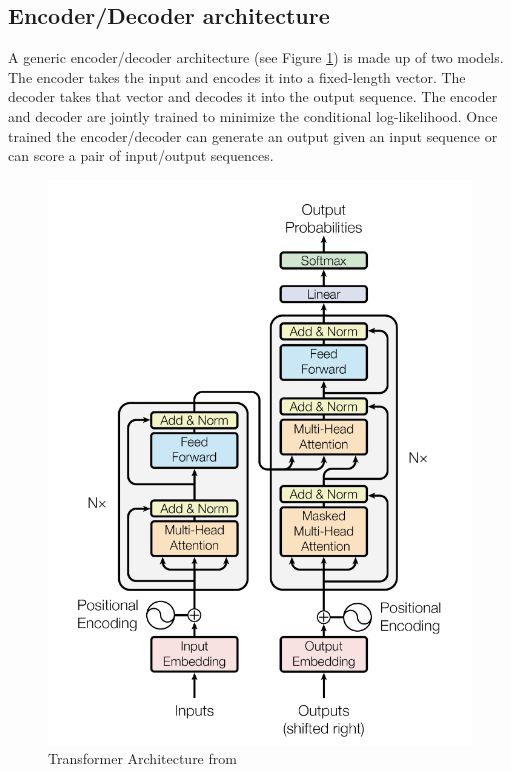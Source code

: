 \documentclass{article}
\begin{document}
\subsection{Encoder/Decoder architecture}

A generic encoder/decoder architecture (see Figure \ref{fig:transformer}) is made up of two models. The encoder takes the input and encodes it into a fixed-length vector. The decoder takes that vector and decodes it into the output sequence. The encoder and decoder are jointly trained to minimize the conditional log-likelihood. Once trained the encoder/decoder can generate an output given an input sequence or can score a pair of input/output sequences.

\begin{figure}
    \centering
    \includegraphics[width=\textwidth,height=\textheight,keepaspectratio]{02-02.png}
    \caption{Transformer Architecture from \cite{vaswani2017attention}}
    \label{fig:transformer}
\end{figure}
\end{document}
